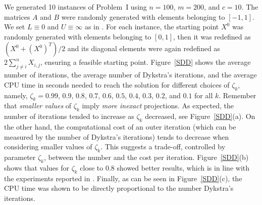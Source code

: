 We generated 10 instances of Problem~I using $n=100$, $m=200$, and $c=10$. The matrices $A$ and $B$ were randomly generated with elements belonging to $[-1,1]$. We set $L\equiv 0$ and $U\equiv \infty$ as in \cite{BirginMartinezRaydan2003}. For each instance, the starting point $X^0$ was randomly generated with elements belonging to $[0,1]$, then it was redefined as $(X^0 + (X^0)^T )/2$ and its diagonal elements were again redefined as $2\sum_{j\neq i}^n X_{i,j}$, ensuring a feasible starting point. Figure~\ref{SDD} shows the average number of iterations,  the average number of Dykstra’s iterations, and the average  CPU time in seconds needed to reach the solution for different choices of $\zeta_k$, namely, $\zeta_k=0.99$, $0.9$, $0.8$, $0.7$, $0.6$, $0.5$, $0.4$, $0.3$, $0.2$, and $0.1$ for all $k$. 
Remember that {\it smaller values} of  $\zeta_k$ imply {\it more inexact} projections. As expected, the number of iterations  tended to increase as $\zeta_k$ decreased, see  Figure~\ref{SDD}(a).
On the other hand, the computational cost of an outer iteration (which can be measured by the number of Dykstra’s iterations) tends to decrease when considering smaller values of $\zeta_k$. 
This suggests a trade-off, controlled by parameter $\zeta_k$, between the number and the cost per iteration.
Figure~\ref{SDD}(b) shows that values for $\zeta_k$ close to 0.8 showed better results, which is in line with the experiments reported in \cite{BirginMartinezRaydan2003}.
Finally, as can be seen in Figure~\ref{SDD}(c), the CPU time was shown to be directly proportional to the number Dykstra’s iterations.
